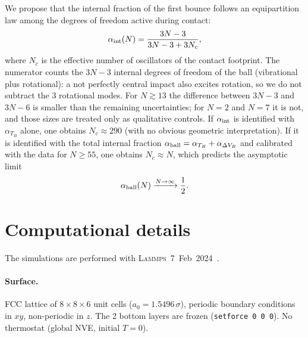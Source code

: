 \documentclass[aps,pre,twocolumn,reprint,superscriptaddress]{revtex4-2}
\newcommand{\lammps}{\textsc{Lammps}}
\begin{document}
We propose that the internal fraction of the first bounce follows an
equipartition law among the degrees of freedom active during contact:
\begin{equation}
    \alpha_{\rm int}(N) = \frac{3N-3}{3N-3+3N_c},
    \label{eq:equiparticion}
\end{equation}
where $N_c$ is the effective number of oscillators of the contact
footprint. The numerator counts the $3N-3$ internal degrees of freedom of
the ball (vibrational plus rotational): a not perfectly central impact also
excites rotation, so we do not subtract the 3 rotational modes. For
$N\gtrsim13$ the difference between $3N-3$ and $3N-6$ is smaller than the
remaining uncertainties; for $N=2$ and $N=7$ it is not, and those sizes are
treated only as qualitative controls.
If $\alpha_{\rm int}$ is identified with $\alpha_{T_B}$ alone, one obtains
$N_c\approx290$ (with no obvious geometric interpretation). If it is
identified with the total internal fraction
$\alpha_{\rm ball}=\alpha_{T_B}+\alpha_{\Delta V_B}$ and calibrated with the
data for $N\geq55$, one obtains $N_c\approx N$, which predicts the
asymptotic limit
\begin{equation}
    \alpha_{\rm ball}(N)\xrightarrow{N\to\infty}\frac{1}{2}.
    \label{eq:limite}
\end{equation}

\section{Computational details}
\label{sec:lammps}

The simulations are performed with \lammps~7~Feb~2024~\cite{Thompson2022}.

\paragraph{Surface.}
FCC lattice of $8\times8\times6$ unit cells ($a_0=1.5496\,\sigma$),
periodic boundary conditions in $xy$, non-periodic in $z$.
The 2 bottom layers are frozen (\texttt{setforce 0 0 0}).
No thermostat (global NVE, initial $T=0$).
\end{document}

